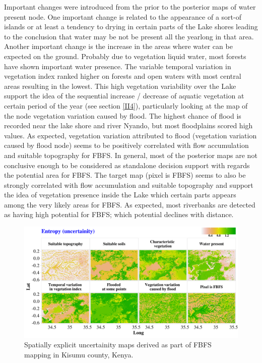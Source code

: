 \documentclass[12pt,oneside]{article}
\begin{document}
Important changes were introduced from the prior to the posterior maps of water present node. One important change is related to the appearance of a sort-of islands or at least a tendency to drying in certain parts of the Lake shores leading to the conclusion that water may be not be present all the yearlong in that area. Another important change is the increase in the areas where water can be expected on the ground. Probably due to vegetation liquid water, most forests have shown important water presence. The variable temporal variation in vegetation index ranked higher on forests and open waters with most central areas resulting in the lowest. This high vegetation variability over the Lake support the idea of the sequential increase / decrease of aquatic vegetation at certain period of the year (see section \ref{II4}), particularly looking at the map of the node vegetation variation caused by flood. The highest chance of flood is recorded near the lake shore and river Nyando, but most floodplains scored high values. As expected, vegetation variation attributed to flood (vegetation variation caused by flood node) seems to be positively correlated with flow accumulation and suitable topography for FBFS. In general, most of the posterior maps are not conclusive enough to be considered as standalone decision support with regards the potential area for FBFS. The target map (pixel is FBFS) seems to also be strongly correlated with flow accumulation and suitable topography and support the idea of vegetation presence inside the Lake which certain parts appears among the very likely areas for FBFS. As expected, most riverbanks are detected as having high potential for FBFS; which potential declines with distance.

\begin{figure}
\includegraphics[width=1\linewidth]{figures/Mapping_FBFS_uncertainity_maps} \caption{Spatially explicit uncertainity maps derived as part of FBFS mapping in Kisumu county, Kenya.}\label{fig:fig13}
\end{figure}
\end{document}
